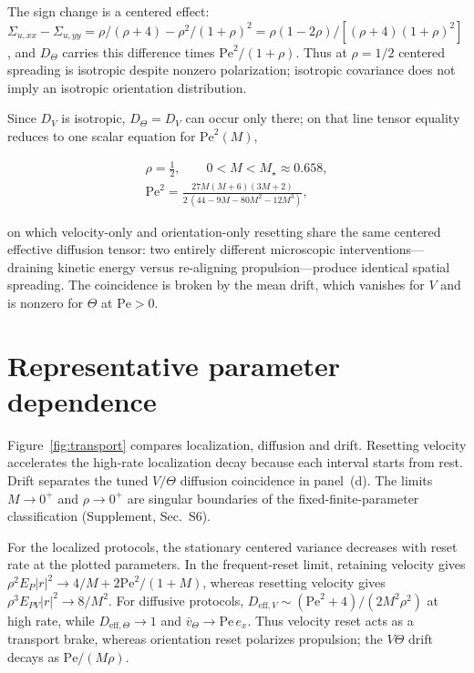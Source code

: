 The sign change is a centered effect: $\Sigma_{u,xx}-\Sigma_{u,yy}=\rho/(\rho+4)-\rho^2/(1+\rho)^2=\rho(1-2\rho)/[(\rho+4)(1+\rho)^2]$, and $D_\Theta$ carries this difference times $\mathrm{Pe}^2/(1+\rho)$. Thus at $\rho=1/2$ centered spreading is isotropic despite nonzero polarization; isotropic covariance does not imply an isotropic orientation distribution.

Since $D_V$ is isotropic, $D_\Theta=D_V$ can occur only there; on that line tensor equality reduces to one scalar equation for $\mathrm{Pe}^2(M)$,

\[
\begin{gathered}
\rho=\tfrac12,\qquad 0<M<M_\star\approx0.658,\\[2pt]
\mathrm{Pe}^2=\frac{27M(M+6)(3M+2)}{2\,(44-9M-80M^2-12M^3)},
\end{gathered}
\]


on which velocity-only and orientation-only resetting share the same centered effective diffusion tensor: two entirely different microscopic interventions---draining kinetic energy versus re-aligning propulsion---produce identical spatial spreading. The coincidence is broken by the mean drift, which vanishes for $V$ and is nonzero for $\Theta$ at $\mathrm{Pe}>0$.

\section{Representative parameter dependence}\label{parameter-dependence}

Figure~\ref{fig:transport} compares localization, diffusion and drift. Resetting velocity accelerates the high-rate localization decay because each interval starts from rest. Drift separates the tuned $V/\Theta$ diffusion coincidence in panel~(d). The limits $M\to0^+$ and $\rho\to0^+$ are singular boundaries of the fixed-finite-parameter classification (Supplement, Sec.~S6).

For the localized protocols, the stationary centered variance decreases with reset rate at the plotted parameters. In the frequent-reset limit, retaining velocity gives $\rho^2E_P|r|^2\to4/M+2\mathrm{Pe}^2/(1+M)$, whereas resetting velocity gives $\rho^3E_{PV}|r|^2\to8/M^2$. For diffusive protocols, $D_{\mathrm{eff},V}\sim(\mathrm{Pe}^2+4)/(2M^2\rho^2)$ at high rate, while $D_{\mathrm{eff},\Theta}\to1$ and $\bar v_\Theta\to\mathrm{Pe}\,e_x$. Thus velocity reset acts as a transport brake, whereas orientation reset polarizes propulsion; the $V\Theta$ drift decays as $\mathrm{Pe}/(M\rho)$.


